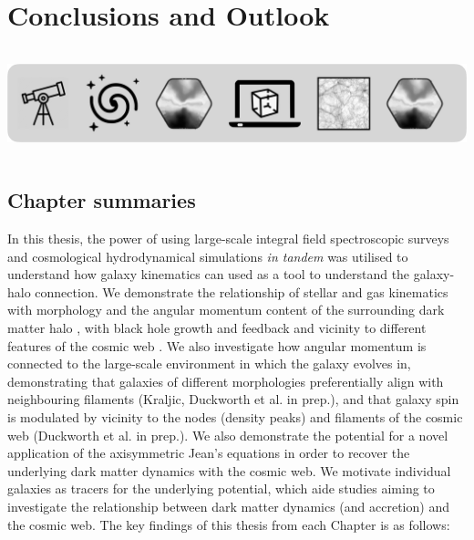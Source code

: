 \chapter{Conclusions and Outlook}
\vspace{-5in}
\includegraphics[height=1.21in]{thesis/latex/headers/icons.pdf}
\vspace{3in}

\section{Chapter summaries}
In this thesis, the power of using large-scale integral field spectroscopic surveys and cosmological hydrodynamical simulations \textit{in tandem} was utilised to understand how galaxy kinematics can used as a tool to understand the galaxy-halo connection. We demonstrate the relationship of stellar and gas kinematics with morphology and the angular momentum content of the surrounding dark matter halo \citep{duckworth2020a}, with black hole growth and feedback \citep{duckworth2020b} and vicinity to different features of the cosmic web \citep{duckworth2019}. We also investigate how angular momentum is connected to the large-scale environment in which the galaxy evolves in, demonstrating that galaxies of different morphologies preferentially align with neighbouring filaments (Kraljic, Duckworth et al. in prep.), and that galaxy spin is modulated by vicinity to the nodes (density peaks) and filaments of the cosmic web (Duckworth et al. in prep.). We also demonstrate the potential for a novel application of the axisymmetric Jean's equations in order to recover the underlying dark matter dynamics with the cosmic web. We motivate individual galaxies as tracers for the underlying potential, which aide studies aiming to investigate the relationship between dark matter dynamics (and accretion) and the cosmic web. The key findings of this thesis from each Chapter is as follows:

